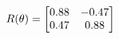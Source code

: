 \documentclass[preview]{standalone}
\begin{document}
\begin{align*}
\special{dvisvgm:raw <g id='unique000'>}R(\theta) = \begin{bmatrix}0.88 & -0.47\\0.47 & 0.88\end{bmatrix}\special{dvisvgm:raw </g>}
\end{align*}
\end{document}
